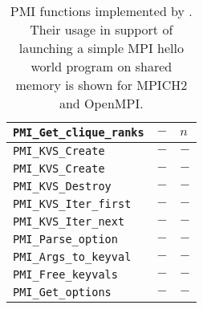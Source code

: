 \begin{table}
\begin{tabular}{|p{8cm}|p{3.5cm}|p{3cm}|}
\hline
{\tt  PMI\_Get\_clique\_ranks} & $-$ & $n$ \\
\hline
{\tt  PMI\_KVS\_Create} & $-$ & $-$ \\
\hline
{\tt  PMI\_KVS\_Create} & $-$ & $-$ \\
\hline
{\tt  PMI\_KVS\_Destroy} & $-$ & $-$ \\
\hline
{\tt  PMI\_KVS\_Iter\_first} & $-$ & $-$ \\
\hline
{\tt  PMI\_KVS\_Iter\_next} & $-$ & $-$ \\
\hline
{\tt  PMI\_Parse\_option} & $-$ & $-$ \\
\hline
{\tt  PMI\_Args\_to\_keyval} & $-$ & $-$ \\
\hline
{\tt  PMI\_Free\_keyvals} & $-$ & $-$ \\
\hline
{\tt  PMI\_Get\_options} & $-$ & $-$ \\
\hline
\end{tabular}
\caption{PMI functions implemented by \slurm.
Their usage in support of launching a simple MPI hello world program
on shared memory is shown for MPICH2 and OpenMPI.}
\label{tab:pmiv1}
\end{table}
